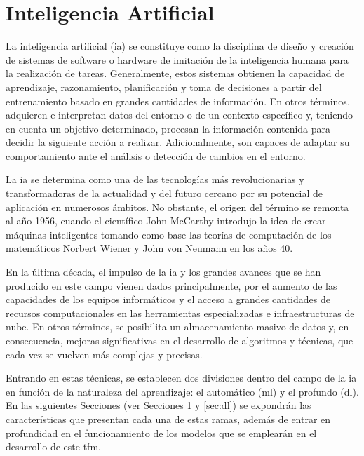 \section{Inteligencia Artificial}
\label{sec:ml}

La inteligencia artificial (\gls{ia}) se constituye como la disciplina de diseño y creación de sistemas de software o hardware de imitación de la inteligencia humana para la realización de tareas. Generalmente, estos sistemas obtienen la capacidad de aprendizaje, razonamiento, planificación y toma de decisiones a partir del entrenamiento basado en grandes cantidades de información. En otros términos, adquieren e interpretan datos del entorno o de un contexto específico y, teniendo en cuenta un objetivo determinado, procesan la información contenida para decidir la siguiente acción a realizar. Adicionalmente, son capaces de adaptar su comportamiento ante el análisis o detección de cambios en el entorno. \cite{iagov} \cite{iaazure}

\vspace{3mm}

La \gls{ia} se determina como una de las tecnologías más revolucionarias y transformadoras de la actualidad y del futuro cercano por su potencial de aplicación en numerosos ámbitos. No obstante, el origen del término se remonta al año 1956, cuando el científico John McCarthy introdujo la idea de crear máquinas inteligentes tomando como base las teorías de computación de los matemáticos Norbert Wiener y John von Neumann en los años 40.~\cite{iagov}

\vspace{3mm}

En la última década, el impulso de la \gls{ia} y los grandes avances que se han producido en este campo vienen dados principalmente, por el aumento de las capacidades de los equipos informáticos y el acceso a grandes cantidades de recursos computacionales en las herramientas especializadas e infraestructuras de nube. En otros términos, se posibilita un almacenamiento masivo de datos y, en consecuencia, mejoras significativas en el desarrollo de algoritmos y técnicas, que cada vez se vuelven más complejas y precisas. 

\vspace{3mm}

Entrando en estas técnicas, se establecen dos divisiones dentro del campo de la \gls{ia} en función de la naturaleza del aprendizaje: el automático (\acrfull{ml}) y el profundo (\acrfull{dl}). En las siguientes Secciones (ver Secciones \ref{sec:ml} y \ref{sec:dl}) se expondrán las características que presentan cada una de estas ramas, además de entrar en profundidad en el funcionamiento de los modelos que se emplearán en el desarrollo de este \gls{tfm}.

